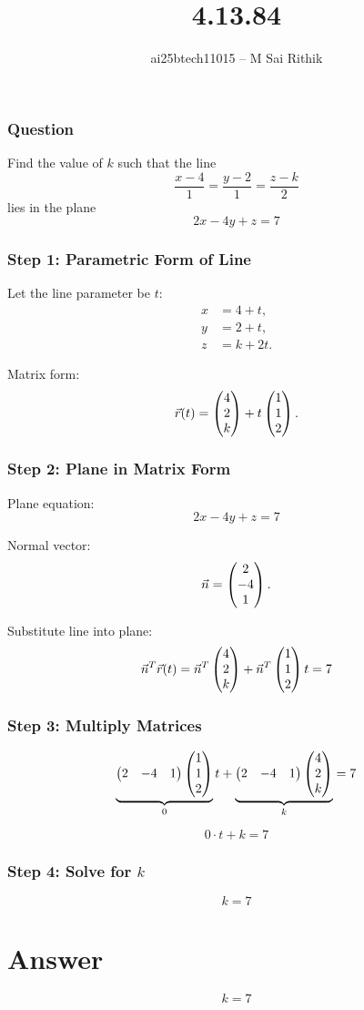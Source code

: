 \documentclass{beamer}
\title{4.13.84}
\author{ai25btech11015 -- M Sai Rithik}
\date{}
\begin{document}
\frame{\titlepage}

\begin{frame}
\frametitle{Question}
Find the value of \(k\) such that the line
\[
\frac{x-4}{1} = \frac{y-2}{1} = \frac{z-k}{2}
\]
lies in the plane
\[
2x - 4y + z = 7
\]
\end{frame}

\begin{frame}
\frametitle{Step 1: Parametric Form of Line}
Let the line parameter be \(t\):
\[
\begin{aligned}
x &= 4 + t,\\
y &= 2 + t,\\
z &= k + 2t.
\end{aligned}
\]

Matrix form:
\[
\Vec{r}(t) = \begin{pmatrix}4\\2\\k\end{pmatrix} + t \begin{pmatrix}1\\1\\2\end{pmatrix}.
\]
\end{frame}

\begin{frame}
\frametitle{Step 2: Plane in Matrix Form}
Plane equation:
\[
2x - 4y + z = 7
\]

Normal vector:
\[
\Vec{n} = \begin{pmatrix}2\\-4\\1\end{pmatrix}.
\]

Substitute line into plane:
\[
\Vec{n}^T \Vec{r}(t) = \Vec{n}^T \begin{pmatrix}4\\2\\k\end{pmatrix} + \Vec{n}^T \begin{pmatrix}1\\1\\2\end{pmatrix} t = 7
\]
\end{frame}

\begin{frame}
\frametitle{Step 3: Multiply Matrices}
\[
\underbrace{\begin{pmatrix}2 & -4 & 1\end{pmatrix}\begin{pmatrix}1\\1\\2\end{pmatrix}}_{0} t
+
\underbrace{\begin{pmatrix}2 & -4 & 1\end{pmatrix}\begin{pmatrix}4\\2\\k\end{pmatrix}}_{k} = 7
\]

\[
0\cdot t + k = 7
\]
\end{frame}

\begin{frame}
\frametitle{Step 4: Solve for \(k\)}
\[
k = 7
\]

\section*{Answer}
\[
\boxed{k = 7}
\]
\end{frame}
\end{document}
